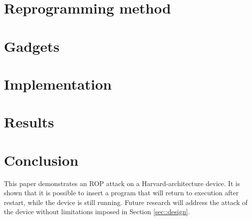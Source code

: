 \section{Reprogramming method} \label{sec::asm} %


\section{Gadgets} \label{sec::gadget} %



\section{Implementation}\label{sec::results} %



\section{Results}\label{res1}


\section{Conclusion}\label{sec::conclusion} 


	This paper demonstrates an ROP attack on a Harvard-architecture device. It is shown that it is possible to insert a program that will return to execution after restart, while the device is still running. Future research will address the attack of the device without limitations imposed in Section \ref{sec::design}.





